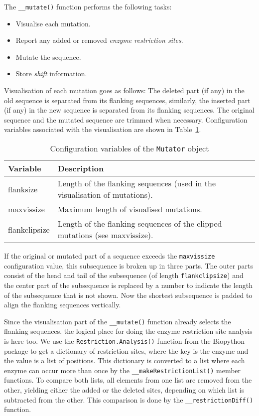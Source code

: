 \documentclass{article}
\begin{document}
The \texttt{\_\_mutate()} function performs the following tasks:
\begin{itemize}
\item Visualise each mutation.
\item Report any added or removed \emph{enzyme restriction sites}.
\item Mutate the sequence.
\item Store \emph{shift} information.
\end{itemize}

Visualisation of each mutation goes as follows: The deleted part (if any) in
the old sequence is separated from its flanking sequences, similarly, the
inserted part (if any) in the new sequence is separated from its flanking
sequences. The original sequence and the mutated sequence are trimmed when
necessary. Configuration variables associated with the visualisation are
shown in Table~\ref{tab:mutatorconfig}.

\begin{table}[H]
\begin{center}
\begin{tabular}{l|p{9cm}}
Variable      & Description \\
\hline
flanksize     & Length of the flanking sequences (used in the visualisation of
                mutations). \\
maxvissize    & Maximum length of visualised mutations. \\
flankclipsize & Length of the flanking sequences of the clipped mutations (see
                maxvissize).
\end{tabular}
\caption{Configuration variables of the \texttt{Mutator} object} 
\label{tab:mutatorconfig}
\end{center}
\end{table}

If the original or mutated part of a sequence exceeds the \texttt{maxvissize} 
configuration value, this subsequence is broken up in three parts. The outer
parts consist of the head and tail of the subsequence (of length 
\texttt{flankclipsize}) and the center part of the subsequence is replaced by
a number to indicate the length of the subsequence that is not shown. Now the
shortest subsequence is padded to align the flanking sequences vertically.

Since the visualisation part of the \texttt{\_\_mutate()} function already
selects the flanking sequences, the logical place for doing the enzyme
restriction site analysis is here too. We use the
\texttt{Restriction.Analysis()} function from the Biopython package to get a
dictionary of restriction sites, where the key is the enzyme and the value is a
list of positions. This dictionary is converted to a list where each enzyme can
occur more than once by the \texttt{\_\_makeRestrictionList()} member
functions. To compare both lists, all elements from one list are removed from
the other, yielding either the added or the deleted sites, depending on which
list is subtracted from the other. This comparison is done by the
\texttt{\_\_restrictionDiff()} function.
\end{document}
